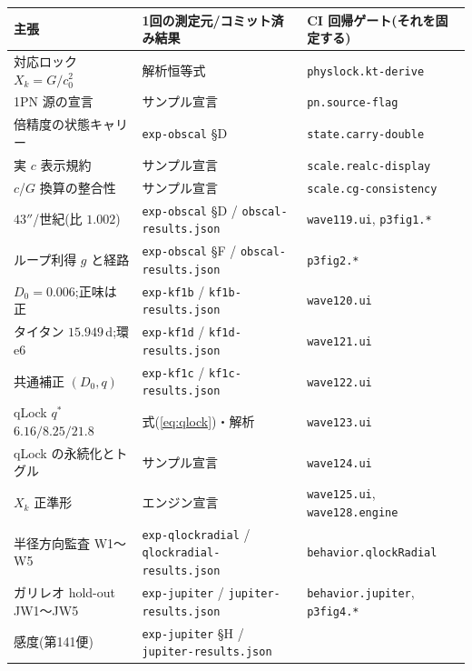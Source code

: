 \documentclass[a4paper,10pt,twocolumn]{ltjsarticle}
\begin{document}
\begin{center}
{\footnotesize\setlength{\tabcolsep}{3pt}
\begin{tabularx}{\columnwidth}{@{}YYY@{}}
\toprule
主張 & 1回の測定元/コミット済み結果 & CI 回帰ゲート(それを固定する) \\
\midrule
対応ロック $X_k=G/c_0^{2}$ & 解析恒等式 &
  \texttt{physlock.\allowbreak kt-derive} \\
1PN 源の宣言 & サンプル宣言 & \texttt{pn.source-flag} \\
倍精度の状態キャリー & \texttt{exp-obscal} \S D &
  \texttt{state.\allowbreak carry-double} \\
実 $c$ 表示規約 & サンプル宣言 &
  \texttt{scale.\allowbreak realc-display} \\
$c$/$G$ 換算の整合性 & サンプル宣言 &
  \texttt{scale.\allowbreak cg-consistency} \\
$43''$/世紀(比 $1.002$) &
  \texttt{exp-obscal} \S D / \texttt{obscal-\allowbreak results.json} &
  \texttt{wave119.ui}, \texttt{p3fig1.*} \\
ループ利得 $g$ と経路 &
  \texttt{exp-obscal} \S F / \texttt{obscal-\allowbreak results.json} &
  \texttt{p3fig2.*} \\
$D_0=0.006$;正味は正 &
  \texttt{exp-kf1b} / \texttt{kf1b-\allowbreak results.json} &
  \texttt{wave120.ui} \\
タイタン $15.949$\,d;環 e6 &
  \texttt{exp-kf1d} / \texttt{kf1d-\allowbreak results.json} &
  \texttt{wave121.ui} \\
共通補正 $(D_0,q)$ &
  \texttt{exp-kf1c} / \texttt{kf1c-\allowbreak results.json} &
  \texttt{wave122.ui} \\
qLock $q^{*}$ $6.16/8.25/21.8$ & 式(\ref{eq:qlock})・解析 &
  \texttt{wave123.ui} \\
qLock の永続化とトグル & サンプル宣言 & \texttt{wave124.ui} \\
$X_k$ 正準形 & エンジン宣言 &
  \texttt{wave125.ui}, \texttt{wave128.\allowbreak engine} \\
半径方向監査 W1〜W5 &
  \texttt{exp-\allowbreak qlockradial} /
  \texttt{qlockradial-\allowbreak results.json} &
  \texttt{behavior.\allowbreak qlockRadial} \\
ガリレオ hold-out JW1〜JW5 &
  \texttt{exp-jupiter} / \texttt{jupiter-\allowbreak results.json} &
  \texttt{behavior.\allowbreak jupiter}, \texttt{p3fig4.*} \\
感度(第141便) &
  \texttt{exp-jupiter} \S H / \texttt{jupiter-\allowbreak results.json} &

\end{tabularx}}
\end{center}
\end{document}
